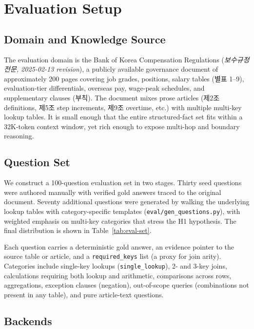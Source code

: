 \section{Evaluation Setup}\label{sec:setup}

\subsection{Domain and Knowledge Source}

The evaluation domain is the Bank of Korea Compensation Regulations
(\emph{보수규정 전문, 2025-02-13 revision}), a publicly available
governance document of approximately 200 pages covering job grades,
positions, salary tables (별표 1--9), evaluation-tier differentials,
overseas pay, wage-peak schedules, and supplementary clauses (부칙).
The document mixes prose articles (제2조 definitions, 제5조 step
increments, 제9조 overtime, etc.) with multiple multi-key lookup tables.
It is small enough that the entire structured-fact set fits within a
32K-token context window, yet rich enough to expose multi-hop and
boundary reasoning.

\subsection{Question Set}

We construct a 100-question evaluation set in two stages. Thirty seed
questions were authored manually with verified gold answers traced to
the original document. Seventy additional questions were generated by
walking the underlying lookup tables with category-specific templates
(\texttt{eval/gen\_questions.py}), with weighted emphasis on multi-key
categories that stress the H1 hypothesis. The final distribution is
shown in Table~\ref{tab:eval-set}.



Each question carries a deterministic gold answer, an evidence pointer
to the source table or article, and a \texttt{required\_keys} list (a
proxy for join arity). Categories include single-key lookups
(\texttt{single\_lookup}), 2- and 3-key joins, calculations requiring
both lookup and arithmetic, comparisons across rows, aggregations,
exception clauses (negation), out-of-scope queries (combinations not
present in any table), and pure article-text questions.

\subsection{Backends}

